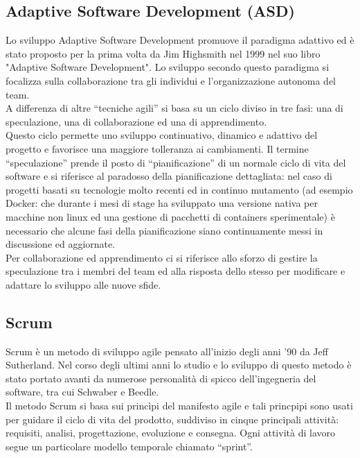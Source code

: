 \subsection{Adaptive Software Development (ASD)}
Lo sviluppo Adaptive Software Development promuove il paradigma adattivo ed è
stato proposto per la prima volta da Jim Highsmith nel 1999 nel suo libro "Adaptive Software Development".
Lo sviluppo secondo questo paradigma si focalizza sulla collaborazione tra gli
individui e l'organizzazione autonoma del team.\\
A differenza di altre \textquotedblleft{}tecniche agili\textquotedblright{}
si basa su un ciclo diviso in tre fasi: una di speculazione, una di
collaborazione ed una di apprendimento.\\
Questo ciclo permette uno sviluppo continuativo, dinamico e adattivo del
progetto e  favorisce una maggiore tolleranza ai cambiamenti.
Il termine \textquotedblleft{}speculazione\textquotedblright{} prende il posto
di \textquotedblleft{}pianificazione\textquotedblright{} di un normale ciclo di
vita del software e si riferisce al paradosso della pianificazione dettagliata:
nel caso di progetti basati su tecnologie molto recenti ed in continuo mutamento
 (ad esempio Docker: che durante i mesi di stage ha sviluppato una versione
 nativa per macchine non linux ed una gestione di pacchetti di containers sperimentale)
  è necessario che alcune fasi della pianificazione siano continuamente
  messi in discussione ed aggiornate.\\
Per collaborazione ed apprendimento ci si riferisce allo sforzo di gestire la
speculazione tra i membri del team ed alla risposta dello stesso per modificare
e adattare lo sviluppo alle nuove sfide.\\

\subsection{Scrum}
Scrum è un metodo di sviluppo agile pensato all'inizio degli anni '90 da
Jeff Sutherland. Nel corso degli ultimi anni lo studio e lo sviluppo di questo
metodo è stato portato avanti da numerose personalità di spicco dell'ingegneria
del software, tra cui Schwaber e Beedle.\\
Il metodo Scrum si basa sui princìpi del manifesto agile e tali princpipi sono
usati per guidare il ciclo di vita del prodotto, suddiviso in cinque principali
attività: requisiti, analisi, progettazione, evoluzione e consegna.
Ogni attività di lavoro segue un particolare modello temporale chiamato
\textquotedblleft{}sprint\textquotedblright{}.


